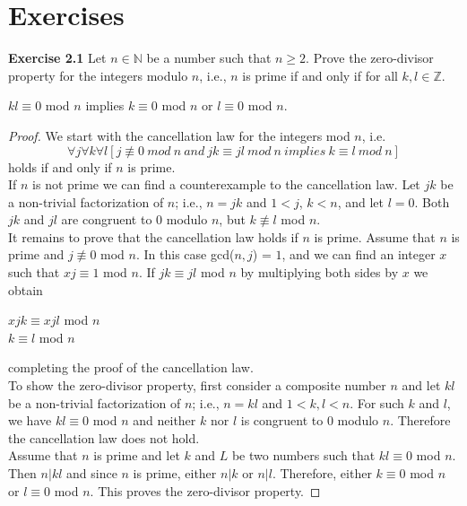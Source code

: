 \documentclass[a4paper]{article}
\begin{document}
\section{Exercises}
\noindent \textbf{Exercise 2.1} Let $n \in \mathbb{N}$ be a number such that $n \geq 2$. Prove the zero-divisor property for the integers modulo $n$, i.e., $n$ is prime if and only if for all $k, l \in \mathbb{Z}$.
\begin{center}
$kl \equiv 0$ mod $n$ implies $k \equiv 0$ mod $n$ or $l \equiv 0$ mod $n$.
\end{center}
\begin{proof}
We start with the cancellation law for the integers mod $n$, i.e.
$$ \forall j \forall k \forall l[j \not \equiv 0\ mod\ n\ and\ jk \equiv jl\ mod\ n\ implies\ k \equiv l\ mod\ n]$$
holds if and only if $n$ is prime. \\
If $n$ is not prime we can find a counterexample to the cancellation law. Let $jk$ be a non-trivial factorization of $n$; i.e., $n = jk$ and $1 < j$, $k < n$, and let $l = 0$. Both $jk$ and $jl$ are congruent to $0$ modulo $n$, but $k \not \equiv l$ mod $n$.\\
It remains to prove that the cancellation law holds if $n$ is prime. Assume that $n$ is prime and $j \not \equiv 0$ mod $n$. In this case gcd($n, j$) = $1$, and we can find an integer $x$ such that $xj \equiv 1$ mod $n$. If $jk \equiv jl$ mod $n$ by multiplying both sides by $x$ we obtain
\begin{center}
$xjk \equiv xjl$ mod $n$\\
$k \equiv l$ mod $n$
\end{center}
completing the proof of the cancellation law.\\
To show the zero-divisor property, first consider a composite number $n$ and let $kl$ be a non-trivial factorization of $n$; i.e., $n = kl$ and $1 < k, l <n$. For such $k$ and $l$, we have $kl \equiv 0$ mod $n$ and neither $k$ nor $l$ is congruent to $0$ modulo $n$. Therefore the cancellation law does not hold.\\
Assume that $n$ is prime and let $k$ and $L$ be two numbers such that $kl \equiv 0$ mod $n$. Then $n|kl$ and since $n$ is prime, either $n|k$ or $n|l$. Therefore, either $k \equiv 0$ mod $n$ or $l \equiv 0$ mod $n$. This proves the zero-divisor property.
\end{proof}
\end{document}
